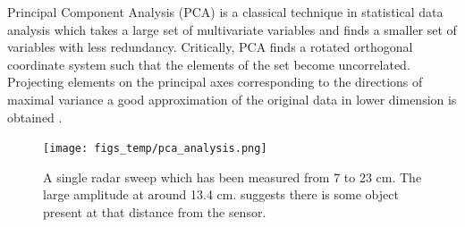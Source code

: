 Principal Component Analysis (PCA) is  a classical technique in statistical data analysis which takes a large set of multivariate variables and finds a smaller set of variables with less redundancy. Critically, PCA finds a rotated orthogonal coordinate system such that the elements of the set become uncorrelated. Projecting elements on the principal axes corresponding to the directions of maximal variance a good approximation of the original data in lower dimension is obtained \citep{hyvasrinen_karhunen_oja_2004}.

\begin{figure}[h]
	\centering
	\texttt{[image: figs\_temp/pca\_analysis.png]}
	\caption{A single radar sweep which has been measured from 7 to 23 cm. The large amplitude at around 13.4 cm. suggests there is some object present at that distance from the sensor.}
	\label{fig:pca}
\end{figure}

